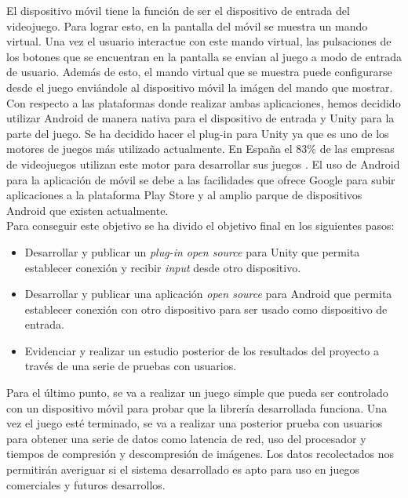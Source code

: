 El dispositivo m\'ovil tiene la funci\'on de ser el dispositivo de entrada del videojuego. Para lograr esto, en la pantalla del m\'ovil se muestra un mando virtual. Una vez el usuario interactue con este mando virtual, las pulsaciones de los botones que se encuentran en la pantalla se envian al juego a modo de entrada de usuario. Adem\'as de esto, el mando virtual que se muestra puede configurarse desde el juego envi\'andole al dispositivo m\'ovil la im\'agen del mando que mostrar.\\

Con respecto a las plataformas donde realizar ambas aplicaciones, hemos decidido utilizar Android de manera nativa para el dispositivo de entrada y Unity para la parte del juego. Se ha decidido hacer el plug-in para Unity ya que es uno de los motores de juegos m\'as utilizado actualmente. En Espa\~na el 83\% de las empresas de videojuegos utilizan este motor para desarrollar sus juegos . El uso de Android para la aplicaci\'on de m\'ovil se debe a las facilidades que ofrece Google para subir aplicaciones a la plataforma Play Store y al amplio parque de dispositivos Android que existen actualmente.\\

Para conseguir este objetivo se ha divido el objetivo final en los siguientes pasos:

\begin {itemize}
\item Desarrollar y publicar un \textit{plug-in open source} para Unity que permita establecer conexi\'on y recibir \textit{input} desde otro dispositivo.
\item Desarrollar y publicar una aplicaci\'on \textit{open source} para Android que permita establecer conexi\'on con otro dispositivo para ser usado como dispositivo de entrada.
\item Evidenciar y realizar un estudio posterior de los resultados del proyecto a trav\'es de una serie de pruebas con usuarios. 
\end {itemize}

Para el \'ultimo punto, se va a realizar un juego simple que pueda ser controlado con un dispositivo m\'ovil para probar que la librer\'ia desarrollada funciona. Una vez el juego est\'e terminado, se va a realizar una posterior prueba con usuarios para obtener una serie de datos como latencia de red, uso del procesador y tiempos de compresi\'on y descompresi\'on de im\'agenes. Los datos recolectados nos permitir\'an averiguar si el sistema desarrollado es apto para uso en juegos comerciales y futuros desarrollos.

